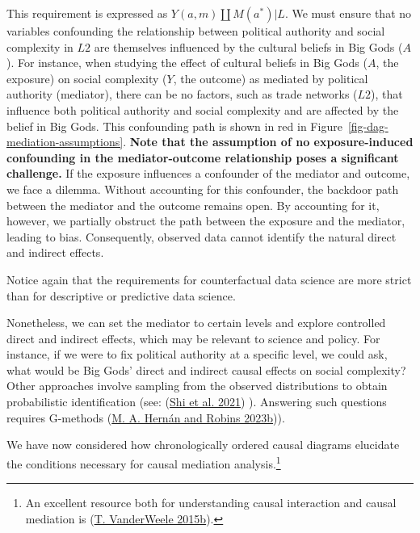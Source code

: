 \documentclass[
  singlecolumn]{article}
\begin{document}
This requirement is expressed as \(Y(a,m) \coprod M(a^*) | L\). We must
ensure that no variables confounding the relationship between political
authority and social complexity in \(L2\) are themselves influenced by
the cultural beliefs in Big Gods (\(A\)). For instance, when studying
the effect of cultural beliefs in Big Gods (\(A\), the exposure) on
social complexity (\(Y\), the outcome) as mediated by political
authority (mediator), there can be no factors, such as trade networks
(\(L2\)), that influence both political authority and social complexity
and are affected by the belief in Big Gods. This confounding path is
shown in red in Figure~\ref{fig-dag-mediation-assumptions}. \textbf{Note
that the assumption of no exposure-induced confounding in the
mediator-outcome relationship poses a significant challenge.} If the
exposure influences a confounder of the mediator and outcome, we face a
dilemma. Without accounting for this confounder, the backdoor path
between the mediator and the outcome remains open. By accounting for it,
however, we partially obstruct the path between the exposure and the
mediator, leading to bias. Consequently, observed data cannot identify
the natural direct and indirect effects.

Notice again that the requirements for counterfactual data science are
more strict than for descriptive or predictive data science.

Nonetheless, we can set the mediator to certain levels and explore
controlled direct and indirect effects, which may be relevant to science
and policy. For instance, if we were to fix political authority at a
specific level, we could ask, what would be Big Gods' direct and
indirect causal effects on social complexity? Other approaches involve
sampling from the observed distributions to obtain probabilistic
identification (see: (\protect\hyperlink{ref-shi2021}{Shi et al. 2021})
). Answering such questions requires G-methods
(\protect\hyperlink{ref-hernuxe1n2023a}{M. A. Hernán and Robins
2023b})).

We have now considered how chronologically ordered causal diagrams
elucidate the conditions necessary for causal mediation
analysis.\footnote{An excellent resource both for understanding causal
  interaction and causal mediation is
  (\protect\hyperlink{ref-vanderweele2015}{T. VanderWeele 2015b}).}
\end{document}
